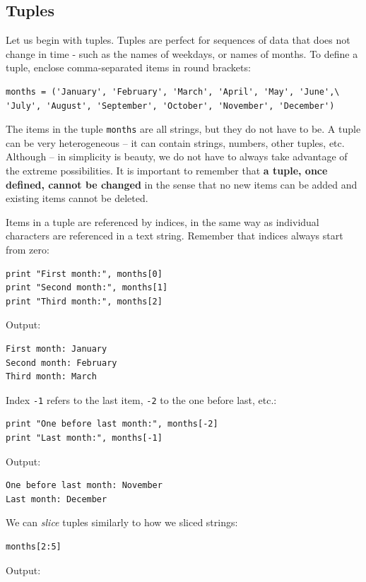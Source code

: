 \subsection{Tuples}

Let us begin with tuples. Tuples are perfect for sequences 
of data that does not change in time - such as 
the names of weekdays, or names of months. To define a tuple, 
enclose comma-separated items in round brackets:

\begin{verbatim}
months = ('January', 'February', 'March', 'April', 'May', 'June',\
'July', 'August', 'September', 'October', 'November', 'December')
\end{verbatim}
The items in the tuple {\tt months} are all strings, but they do not
have to be. A tuple can be very heterogeneous -- it can contain strings,
numbers, other tuples, etc. Although -- in simplicity is beauty, we
do not have to always take advantage of the extreme possibilities.
It is important to remember that {\bf a tuple, once defined, cannot 
be changed} in the sense that no new items can be added and existing 
items cannot be deleted.

Items in a tuple are referenced by indices, in the same way as individual 
characters are referenced in a text string. Remember that indices always 
start from zero:

\begin{verbatim}
print "First month:", months[0]
print "Second month:", months[1]
print "Third month:", months[2]
\end{verbatim}
Output:

\begin{verbatim}
First month: January
Second month: February
Third month: March
\end{verbatim}
Index {\tt -1} refers to the last item, {\tt -2} to the one before last, etc.:

\begin{verbatim}
print "One before last month:", months[-2]
print "Last month:", months[-1]
\end{verbatim}
Output:

\begin{verbatim}
One before last month: November
Last month: December
\end{verbatim}

\noindent
We can {\em slice} tuples similarly to how we sliced strings:

\begin{verbatim}
months[2:5]
\end{verbatim}
Output:


